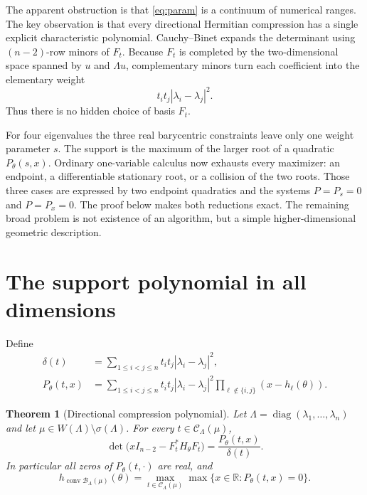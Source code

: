 \documentclass[11pt]{article}
\newcommand{\R}{\mathbb R}
\newcommand{\conv}{\operatorname{conv}}
\newcommand{\diag}{\operatorname{diag}}
\newcommand{\spec}{\sigma}
\newcommand{\cB}{\mathcal B}
\newcommand{\cC}{\mathcal C}
\numberwithin{equation}{section}
\newtheorem{theorem}{Theorem}
\theoremstyle{definition}
\begin{document}
The apparent obstruction is that \eqref{eq:param} is a continuum of numerical ranges.
The key observation is that every directional Hermitian compression has a
single explicit characteristic polynomial.  Cauchy--Binet expands the
determinant using $(n-2)$-row minors of $F_t$.  Because $F_t$ is completed by
the two-dimensional space spanned by $u$ and $\Lambda u$, complementary
minors turn each coefficient into the elementary weight
\[
 t_i t_j|\lambda_i-\lambda_j|^2.
\]
Thus there is no hidden choice of basis $F_t$.

For four eigenvalues the three real barycentric constraints leave only one
weight parameter $s$.  The support is the maximum of the larger root of a
quadratic $P_\theta(s,x)$.  Ordinary one-variable calculus now exhausts every
maximizer: an endpoint, a differentiable stationary root, or a collision of
the two roots.  Those three cases are expressed by two endpoint quadratics and
the systems $P=P_s=0$ and $P=P_x=0$.  The proof below makes both reductions
exact.  The remaining broad problem is not existence of an algorithm, but a
simple higher-dimensional geometric description.

\section{The support polynomial in all dimensions}

Define
\begin{align}
 \delta(t)&=\sum_{1\leq i<j\leq n}
 t_it_j|\lambda_i-\lambda_j|^2,\label{eq:delta}\\
 P_\theta(t,x)&=\sum_{1\leq i<j\leq n}
 t_it_j|\lambda_i-\lambda_j|^2
 \prod_{\ell\notin\{i,j\}}(x-h_\ell(\theta)).\label{eq:poly}
\end{align}

\begin{theorem}[Directional compression polynomial]\label{thm:polynomial}
Let $\Lambda=\diag(\lambda_1,\ldots,\lambda_n)$ and let
$\mu\in W(\Lambda)\setminus\spec(\Lambda)$.  For every
$t\in\cC_\Lambda(\mu)$,
\begin{equation}
 \det\bigl(xI_{n-2}-F_t^*H_\theta F_t\bigr)
   =\frac{P_\theta(t,x)}{\delta(t)}.
 \label{eq:char}
\end{equation}
In particular all zeros of $P_\theta(t,\cdot)$ are real, and
\begin{equation}
 h_{\conv\cB_A(\mu)}(\theta)
 =\max_{t\in\cC_\Lambda(\mu)}
   \max\{x\in\R:P_\theta(t,x)=0\}.
 \label{eq:support-general}
\end{equation}
\end{theorem}
\end{document}
